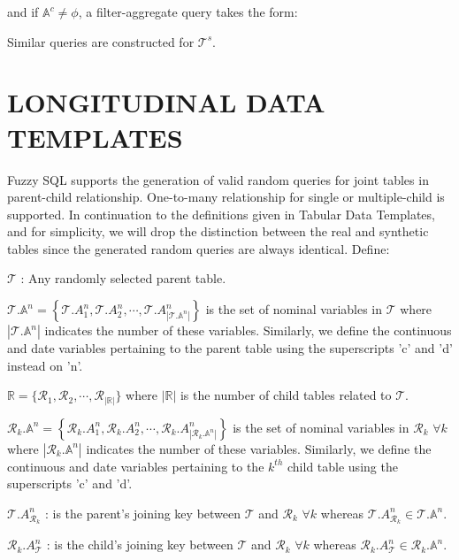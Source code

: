 \documentclass[10pt]{article}
\begin{document}
and if $\mathbb{A}^{c} \neq \phi$, a filter-aggregate query takes the form:



Similar queries are constructed for $\mathcal{T}^s$.


\section{LONGITUDINAL DATA TEMPLATES}

Fuzzy SQL supports the generation of valid random queries for joint tables in parent-child relationship. One-to-many relationship for single or multiple-child is supported. In continuation to the definitions given in Tabular Data Templates, and for simplicity, we will drop the distinction between the real and synthetic tables since the generated random queries are always identical. Define:

$\mathcal{T}$ : Any randomly selected parent table.

$\mathcal{T}.\mathbb{A}^{n}=\left\{\mathcal{T}.A_{1}^{n}, \mathcal{T}.A_{2}^{n}, \cdots, \mathcal{T}.A_{\left|\mathcal{T}.\mathbb{A}^{n}\right|}^{n}\right\}$ is the set of nominal variables in  $\mathcal{T}$ where $\left|\mathcal{T}.\mathbb{A}^{n}\right|$ indicates the number of these variables. Similarly, we define the continuous and date variables pertaining to the parent table using the superscripts 'c' and 'd' instead on 'n'. 

$\mathbb{R}=\{\mathcal{R}_1, \mathcal{R}_2, \cdots, \mathcal{R}_{|\mathbb{R}|}\}$ where $|\mathbb{R}|$ is the number of child tables related to $\mathcal{T}$.

$\mathcal{R}_k.\mathbb{A}^{n}=\left\{\mathcal{R}_k.A_{1}^{n}, \mathcal{R}_k.A_{2}^{n}, \cdots, \mathcal{R}_k.A_{\left|\mathcal{R}_k.\mathbb{A}^{n}\right|}^{n}\right\}$ is the set of nominal variables in  $\mathcal{R}_k$  $\forall k$ where $\left|\mathcal{R}_k.\mathbb{A}^{n}\right|$ indicates the number of these variables. Similarly, we define the continuous and date variables pertaining to the $k^{th}$ child table using the superscripts 'c' and 'd'. 

$\mathcal{T}.A^n_{\mathcal{R}_k}$ : is the parent's joining key between $\mathcal{T}$ and $\mathcal{R}_k$ $\forall k$ whereas $\mathcal{T}.A^n_{\mathcal{R}_k} \in \mathcal{T}.\mathbb{A}^n$.

$\mathcal{R}_k.A^n_{\mathcal{T}}$ : is the child's joining key between $\mathcal{T}$ and $\mathcal{R}_k$ $\forall k$ whereas $\mathcal{R}_k.A^n_{\mathcal{T}} \in \mathcal{R}_k.\mathbb{A}^n$.
\end{document}

